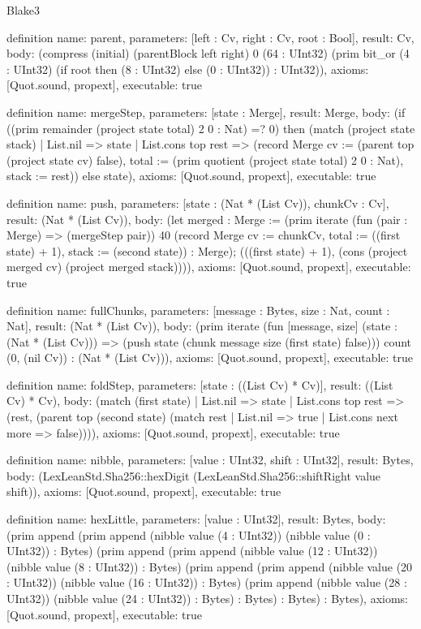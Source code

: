 \begin{lexlean}{Blake3}
\begin{semanticmodule}
definition{
  name: parent,
  parameters: [left : Cv, right : Cv, root : Bool],
  result: Cv,
  body: (compress (initial) (parentBlock left right) 0 (64 : UInt32) (prim bit_or (4 : UInt32) (if root then (8 : UInt32) else (0 : UInt32)) : UInt32)),
  axioms: [Quot.sound, propext],
  executable: true
}

definition{
  name: mergeStep,
  parameters: [state : Merge],
  result: Merge,
  body: (if ((prim remainder (project state total) 2 0 : Nat) =? 0) then (match (project state stack)
    | List.nil => state
    | List.cons top rest => (record Merge {cv := (parent top (project state cv) false), total := (prim quotient (project state total) 2 0 : Nat), stack := rest})) else state),
  axioms: [Quot.sound, propext],
  executable: true
}

definition{
  name: push,
  parameters: [state : (Nat * (List Cv)), chunkCv : Cv],
  result: (Nat * (List Cv)),
  body: (let merged : Merge := (prim iterate (fun (pair : Merge) => (mergeStep pair)) 40 (record Merge {cv := chunkCv, total := ((first state) + 1), stack := (second state)}) : Merge); (((first state) + 1), (cons (project merged cv) (project merged stack)))),
  axioms: [Quot.sound, propext],
  executable: true
}

definition{
  name: fullChunks,
  parameters: [message : Bytes, size : Nat, count : Nat],
  result: (Nat * (List Cv)),
  body: (prim iterate (fun [message, size] (state : (Nat * (List Cv))) => (push state (chunk message size (first state) false))) count (0, (nil Cv)) : (Nat * (List Cv))),
  axioms: [Quot.sound, propext],
  executable: true
}

definition{
  name: foldStep,
  parameters: [state : ((List Cv) * Cv)],
  result: ((List Cv) * Cv),
  body: (match (first state)
    | List.nil => state
    | List.cons top rest => (rest, (parent top (second state) (match rest
      | List.nil => true
      | List.cons next more => false)))),
  axioms: [Quot.sound, propext],
  executable: true
}

definition{
  name: nibble,
  parameters: [value : UInt32, shift : UInt32],
  result: Bytes,
  body: (LexLeanStd.Sha256::hexDigit (LexLeanStd.Sha256::shiftRight value shift)),
  axioms: [Quot.sound, propext],
  executable: true
}

definition{
  name: hexLittle,
  parameters: [value : UInt32],
  result: Bytes,
  body: (prim append (prim append (nibble value (4 : UInt32)) (nibble value (0 : UInt32)) : Bytes) (prim append (prim append (nibble value (12 : UInt32)) (nibble value (8 : UInt32)) : Bytes) (prim append (prim append (nibble value (20 : UInt32)) (nibble value (16 : UInt32)) : Bytes) (prim append (nibble value (28 : UInt32)) (nibble value (24 : UInt32)) : Bytes) : Bytes) : Bytes) : Bytes),
  axioms: [Quot.sound, propext],
  executable: true
}


\end{semanticmodule}
\end{lexlean}
